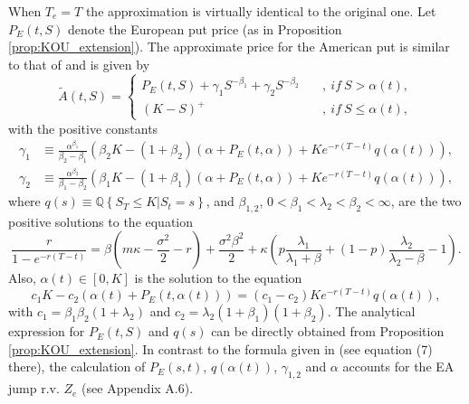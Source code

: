\documentclass[11pt]{article}
\numberwithin{equation}{section}
\numberwithin{theorem}{section}
\begin{document}
When $T_{e}=T$ the approximation is virtually identical to the original
one. Let $P_{E}\left(t,S\right)$ denote the European put price (as
in Proposition \ref{prop:KOU_extension}). The approximate price for the American put is similar to that of \cite{Kou2004} and is given by
\begin{equation}
\tilde{A}\left(t,S\right)=\begin{cases}
P_{E}\left(t,S\right)+\gamma_{1}S^{-\beta_{1}}+\gamma_{2}S^{-\beta_{2}} & \quad,\ if\ S>\alpha(t),\\
\left(K-S\right)^{+} & \quad,\ if\ S\leq\alpha(t),
\end{cases}\label{eq:AM_DE_apx-1}
\end{equation}
with the positive constants  
\begin{align}
\gamma_{1} & \equiv\frac{\alpha^{\beta_{1}}}{\beta_{2}-\beta_{1}}\left(\beta_{2}K-\left(1+\beta_{2}\right)\left(\alpha+P_{E}\left(t,\alpha\right)\right)+Ke^{-r\left(T-t\right)}q(\alpha(t)) \right),\label{eq:gamma1} \\
\gamma_{2} & \equiv\frac{\alpha^{\beta_{2}}}{\beta_{1}-\beta_{2}}\left(\beta_{1}K-\left(1+\beta_{1}\right)\left(\alpha+P_{E}\left(t,\alpha\right)\right)+Ke^{-r\left(T-t\right)}q(\alpha(t)) \right),\label{eq:gamma2}
\end{align}
where $q(s)\equiv \mathbb{Q}\left\{ S_{T}\leq K\vert S_{t}=s\right\}$, and  $\beta_{1,2}$, $0<\beta_{1}<\lambda_{2}<\beta_{2}<\infty$, are the two positive
solutions to the equation 
\begin{equation}
\frac{r}{1-e^{-r\left(T-t\right)}}=\beta\left(m\kappa-\frac{\sigma^{2}}{2}-r\right)+\frac{\sigma^{2}\beta^{2}}{2}+\kappa\left(p\frac{\lambda_{1}}{\lambda_{1}+\beta}+\left(1-p\right)\frac{\lambda_{2}}{\lambda_{2}-\beta}-1\right).\label{eq:betas}
\end{equation}
Also,  $\alpha(t)\in\left[0,K\right]$ is the solution to the equation 
\begin{equation}
c_{1}K-c_{2}\left(\alpha(t)+P_{E}\left(t,\alpha(t)\right)\right)=\left(c_{1}-c_{2}\right)Ke^{-r\left(T-t\right)}q(\alpha(t)) ,\label{eq:alphat}
\end{equation}
with $c_{1}=\beta_{1}\beta_{2}\left(1+\lambda_{2}\right)$ and $c_{2}=\lambda_{2}\left(1+\beta_{1}\right)\left(1+\beta_{2}\right)$.
The analytical expression for $P_{E}\left(t,S\right)$ and $q(s)$
can be directly obtained from Proposition \ref{prop:KOU_extension}. In contrast to the formula given in \citet{Kou2004} (see equation (7) there), the calculation of  $P_{E}\left(s,t\right)$,  $q(\alpha(t))$, $\gamma_{1,2}$ and $\alpha$  accounts for the EA jump r.v. $Z_{e}$ (see Appendix A.6).  
\end{document}
